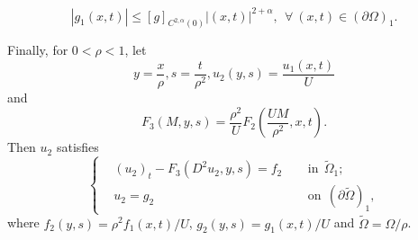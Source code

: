 \documentclass[preprint,12pt]{elsarticle}
\theoremstyle{definition}
\theoremstyle{remark}
\numberwithin{equation}{section}
\begin{document}
\begin{equation*}
  |g_1(x,t)|\leq [g]_{C^{2,\alpha}(0)}|(x,t)|^{2+\alpha}, ~~\forall ~(x,t)\in (\partial \Omega)_1.
\end{equation*}


Finally, for $0<\rho<1$, let
\begin{equation*}
y=\frac{x}{\rho}, s=\frac{t}{\rho^2}, u_2(y,s)=\frac{u_1(x,t)}{U}
\end{equation*}
and
\begin{equation*}
F_3(M,y,s)= \frac{\rho^2}{U} F_2\left(\frac{UM}{\rho^2},x,t\right).
\end{equation*}
Then $u_2$ satisfies
\begin{equation}\label{F5-1}
\left\{\begin{aligned}
&(u_2)_t-F_3(D^2u_2,y,s)=f_2&& ~~\mbox{in}~~\tilde{\Omega}_1;\\
&u_2=g_2&& ~~\mbox{on}~~(\partial \tilde\Omega)_1,
\end{aligned}\right.
\end{equation}
where $f_2(y,s)=\rho^2 f_1(x,t)/U$, $g_2(y,s)=g_1(x,t)/U$ and $\tilde{\Omega}=\Omega/\rho$.
\end{document}
